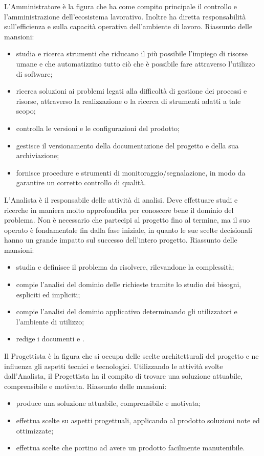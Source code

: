 			L'Amministratore è la figura che ha come compito principale il controllo e l'amministrazione dell'ecosistema lavorativo. Inoltre ha diretta responsabilità sull'efficienza e sulla capacità operativa dell'ambiente di lavoro.
			Riassunto delle mansioni:
			\begin{itemize}
				\item studia e ricerca strumenti che riducano il più possibile l'impiego di risorse umane e che automatizzino tutto ciò che è possibile fare attraverso l'utilizzo di software;
				\item ricerca soluzioni ai problemi legati alla difficoltà di gestione dei processi e risorse, attraverso la realizzazione o la ricerca di strumenti adatti a tale scopo;
				\item controlla le versioni e le configurazioni del prodotto;
				\item gestisce il versionamento della documentazione del progetto e della sua archiviazione;
				\item fornisce procedure e strumenti di monitoraggio/segnalazione, in modo da garantire un corretto controllo di qualità.
			\end{itemize}

			L'Analista è il responsabile delle attività di analisi. Deve effettuare studi e ricerche in maniera molto approfondita per conoscere bene il dominio del problema. Non è necessario che partecipi al progetto fino al termine, ma il suo operato è fondamentale fin dalla fase iniziale, in quanto le sue scelte decisionali hanno un grande impatto sul successo dell'intero progetto.
			Riassunto delle mansioni:
			\begin{itemize}
				\item studia e definisce il problema da risolvere, rilevandone la complessità;
				\item compie l'analisi del dominio delle richieste tramite lo studio dei bisogni, espliciti ed impliciti;
				\item compie l'analisi del dominio applicativo determinando gli utilizzatori e l'ambiente di utilizzo;
				\item redige i documenti \AdR{} e \SdF{}.
			\end{itemize}

			Il Progettista è la figura che si occupa delle scelte architetturali del progetto e ne influenza gli aspetti tecnici e tecnologici. Utilizzando le attività svolte dall'Analista, il Progettista ha il compito di trovare una soluzione attuabile, comprensibile e motivata.
			Riassunto delle mansioni:
			\begin{itemize}
				\item produce una soluzione attuabile, comprensibile e motivata;
				\item effettua scelte su aspetti progettuali, applicando al prodotto soluzioni note ed ottimizzate;
				\item effettua scelte che portino ad avere un prodotto facilmente manutenibile.
			\end{itemize}

